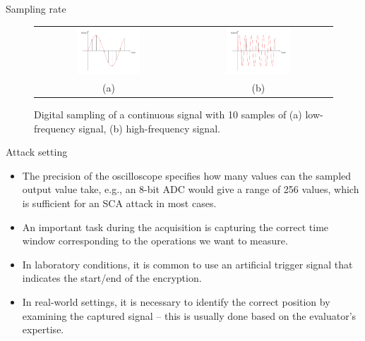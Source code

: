 \begin{frame}{Sampling rate}
    \begin{figure}
    \centering
    \begin{tabular}{cc}
        \includegraphics[width=0.45\textwidth]{fig/_TikZ__Digital_sine_book-2.pdf} & \includegraphics[width=0.45\textwidth]{fig/_TikZ__Digital_sine___high_freq_book-2.pdf} \\
        (a) & (b)
    \end{tabular}
    \caption{Digital sampling of a continuous signal with 10 samples of (a) low-frequency signal, (b) high-frequency signal.}
    \label{fig:sampling}
\end{figure}
\end{frame}

\begin{frame}{Attack setting}
    \begin{itemize}
        \item The precision of the oscilloscope specifies how many values can the sampled output value take, e.g., an 8-bit ADC would give a range of 256 values, which is sufficient for an SCA attack in most cases.
        \item An important task during the acquisition is capturing the correct time window corresponding to the operations we want to measure.
        \item In laboratory conditions, it is common to use an artificial trigger signal that indicates the start/end of the encryption.
        \item In real-world settings, it is necessary to identify the correct position by examining the captured signal -- this is usually done based on the evaluator's expertise.
    \end{itemize}
\end{frame}

